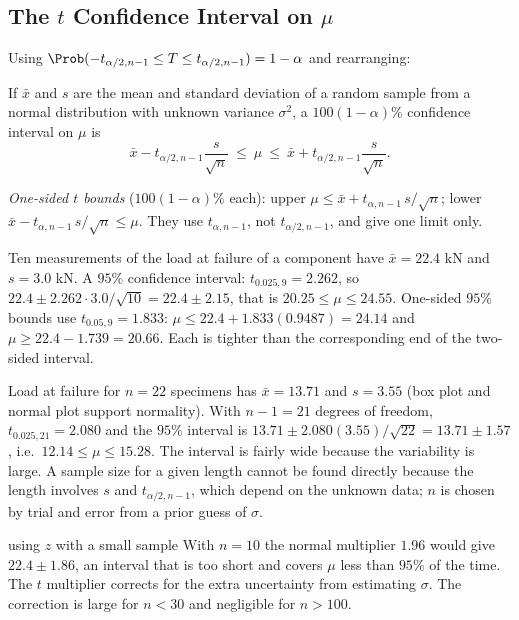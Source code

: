 \subsection{The $t$ Confidence Interval on $\mu$}

Using $\Prob(-t_{\alpha/2,n-1}\le T\le t_{\alpha/2,n-1})=1-\alpha$ and rearranging:

\begin{theorem}[$t$ interval]\label{thm:t-ci}
If $\bar{x}$ and $s$ are the mean and standard deviation of a random sample from a normal distribution with unknown variance $\sigma^2$, a $100(1-\alpha)\%$ confidence interval on $\mu$ is
\[ \bar{x}-t_{\alpha/2,n-1}\frac s{\sqrt n}\ \le\ \mu\ \le\ \bar{x}+t_{\alpha/2,n-1}\frac s{\sqrt n}. \]

\emph{One-sided $t$ bounds} ($100(1-\alpha)\%$ each): upper $\mu\le\bar{x}+t_{\alpha,n-1}\,s/\sqrt n$; lower $\bar{x}-t_{\alpha,n-1}\,s/\sqrt n\le\mu$. They use $t_{\alpha,n-1}$, not $t_{\alpha/2,n-1}$, and give one limit only.
\end{theorem}

\begin{example}\label{ex:t-ci}
Ten measurements of the load at failure of a component have $\bar{x}=22.4$ kN and $s=3.0$ kN. A $95\%$ confidence interval: $t_{0.025,9}=2.262$, so $22.4\pm2.262\cdot3.0/\sqrt{10}=22.4\pm2.15$, that is $20.25\le\mu\le24.55$. One-sided $95\%$ bounds use $t_{0.05,9}=1.833$: $\mu\le22.4+1.833(0.9487)=24.14$ and $\mu\ge22.4-1.739=20.66$. Each is tighter than the corresponding end of the two-sided interval.
\end{example}

\begin{example}
Load at failure for $n=22$ specimens has $\bar{x}=13.71$ and $s=3.55$ (box plot and normal plot support normality). With $n-1=21$ degrees of freedom, $t_{0.025,21}=2.080$ and the $95\%$ interval is $13.71\pm2.080(3.55)/\sqrt{22}=13.71\pm1.57$, i.e.\ $12.14\le\mu\le15.28$. The interval is fairly wide because the variability is large. A sample size for a given length cannot be found directly because the length involves $s$ and $t_{\alpha/2,n-1}$, which depend on the unknown data; $n$ is chosen by trial and error from a prior guess of $\sigma$.
\end{example}

\begin{pitfall}{using $z$ with a small sample}
With $n=10$ the normal multiplier $1.96$ would give $22.4\pm1.86$, an interval that is too short and covers $\mu$ less than $95\%$ of the time. The $t$ multiplier corrects for the extra uncertainty from estimating $\sigma$. The correction is large for $n<30$ and negligible for $n>100$.
\end{pitfall}

